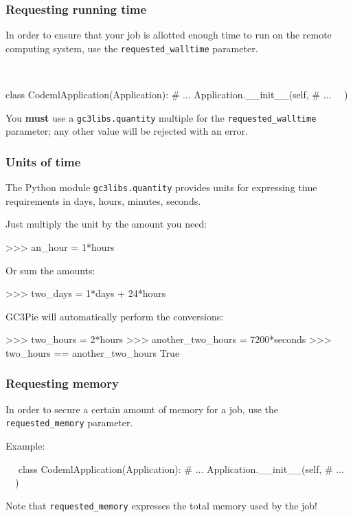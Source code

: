 \documentclass[english,serif,mathserif,xcolor=pdftex,dvipsnames,table]{beamer}
\begin{document}
\begin{frame}[fragile]
  \frametitle{Requesting running time}

  In order to ensure that your job is allotted enough time to run on
  the remote computing system, use the \lstinline|requested_walltime|
  parameter.

  \+
  \begin{python}
  ~~ \
    ~~

  class CodemlApplication(Application):
    # ...
    Application.__init__(self,
      # ...
      ~~)
  \end{python}

  \+
  You \textbf{must} use a \texttt{gc3libs.quantity} multiple for the
  \lstinline|requested_walltime| parameter; any other value will be
  rejected with an error.
\end{frame}

\begin{frame}[fragile]
  \frametitle{Units of time}
  The Python module \texttt{gc3libs.quantity} provides units for
  expressing time requirements in days, hours, minutes, seconds.

  \+
  Just multiply the unit by the amount you need:
  \begin{python}
    >>> an_hour = 1*hours
  \end{python}
  Or sum the amounts:
  \begin{python}
    >>> two_days = 1*days + 24*hours
  \end{python}

  \+
  GC3Pie will automatically perform the conversions:
  \begin{python}
    >>> two_hours = 2*hours
    >>> another_two_hours = 7200*seconds
    >>> two_hours == another_two_hours
    True
  \end{python}
\end{frame}


\begin{frame}[fragile]
  \frametitle{Requesting memory}
  In order to secure a certain amount of memory for a job, use the
  \lstinline|requested_memory| parameter.

  \+
  Example:
\begin{python}
  ~~
  class CodemlApplication(Application):
    # ...
    Application.__init__(self,
      # ...
      ~~)
\end{python}

  \+
  Note that \lstinline|requested_memory| expresses the total
  memory used by the job!
\end{frame}
\end{document}
